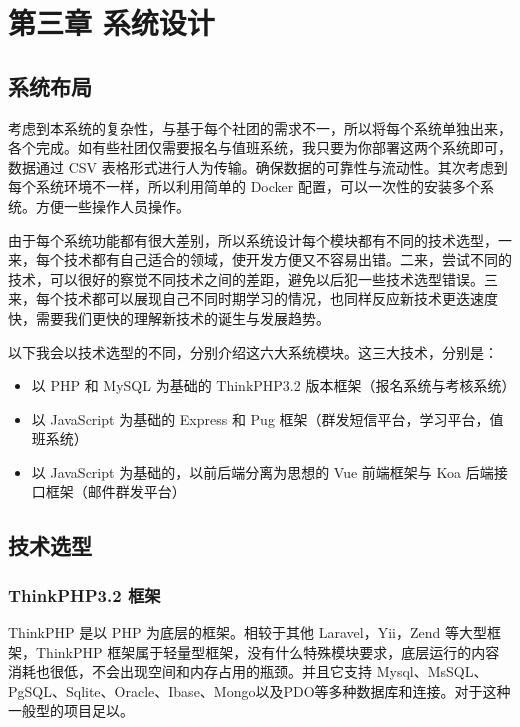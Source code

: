 \chapter{第三章 系统设计}
\label{cha:usage}

\section{系统布局}
\label{sec:requirements}

考虑到本系统的复杂性，与基于每个社团的需求不一，所以将每个系统单独出来，各个完成。如有些社团仅需要报名与值班系统，我只要为你部署这两个系统即可，数据通过 CSV 表格形式进行人为传输。确保数据的可靠性与流动性。其次考虑到每个系统环境不一样，所以利用简单的 Docker 配置，可以一次性的安装多个系统。方便一些操作人员操作。

由于每个系统功能都有很大差别，所以系统设计每个模块都有不同的技术选型，一来，每个技术都有自己适合的领域，使开发方便又不容易出错。二来，尝试不同的技术，可以很好的察觉不同技术之间的差距，避免以后犯一些技术选型错误。三来，每个技术都可以展现自己不同时期学习的情况，也同样反应新技术更迭速度快，需要我们更快的理解新技术的诞生与发展趋势。

以下我会以技术选型的不同，分别介绍这六大系统模块。这三大技术，分别是：
\begin{itemize}
  \item 以 PHP 和 MySQL 为基础的 ThinkPHP3.2 版本框架（报名系统与考核系统）
  \item 以 JavaScript 为基础的 Express 和 Pug 框架（群发短信平台，学习平台，值班系统）
  \item 以 JavaScript 为基础的，以前后端分离为思想的 Vue 前端框架与 Koa 后端接口框架（邮件群发平台）
\end{itemize}

\section{技术选型}
\label{sec:requirements}

\subsection{ThinkPHP3.2 框架}
\label{sec:requirements}

ThinkPHP 是以 PHP 为底层的框架。相较于其他 Laravel，Yii，Zend 等大型框架，ThinkPHP 框架属于轻量型框架，没有什么特殊模块要求，底层运行的内容消耗也很低，不会出现空间和内存占用的瓶颈。并且它支持 Mysql、MsSQL、PgSQL、Sqlite、Oracle、Ibase、Mongo以及PDO等多种数据库和连接。对于这种一般型的项目足以。

